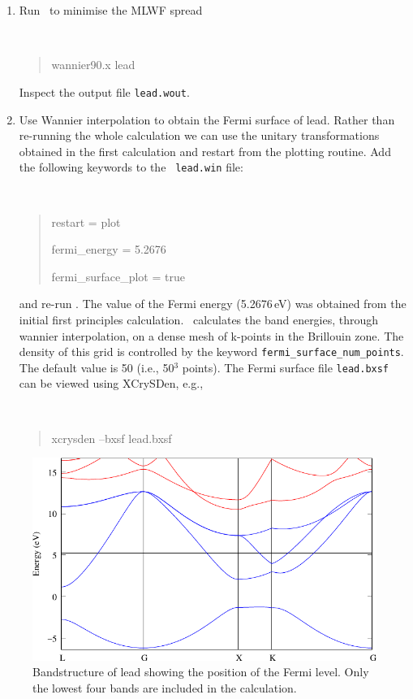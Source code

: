 \documentclass[a4paper,11pt,twoside]{article}
\begin{document}
\begin{enumerate}
\item Run \wannier\ to minimise the MLWF spread
{\tt
\begin{quote}
wannier90.x lead
\end{quote} }
Inspect the output file {\tt lead.wout}.
\item Use Wannier interpolation to obtain the Fermi surface of
  lead. Rather than re-running the whole calculation we can use the
  unitary transformations obtained in the first calculation and restart
  from the plotting routine. Add the following keywords to the {\tt
    lead.win} file: 
{\tt
\begin{quote}
restart = plot

fermi\_energy = 5.2676

fermi\_surface\_plot = true
\end{quote} }
and re-run \wannier. The value of the Fermi energy (5.2676\,eV) was
obtained from the initial first principles calculation. \wannier\
calculates the band energies, through wannier interpolation, on a 
dense mesh of k-points in the Brillouin zone. The density of this grid is
controlled by the keyword {\tt fermi\_surface\_num\_points}. The default
value is 50 (i.e., 50$^3$ points). 
The Fermi surface file {\tt lead.bxsf} can be viewed using XCrySDen,
e.g.,
{\tt
\begin{quote}
xcrysden --bxsf lead.bxsf
\end{quote} }
\end{enumerate}

\begin{figure}[h]
\begin{center}
\includegraphics{lead}
\caption{Bandstructure of lead showing the position of the Fermi
  level. Only the lowest four bands are included in the calculation.} 
\label{fig:pb-bnd}
\end{center}
\end{figure}
\end{document}
